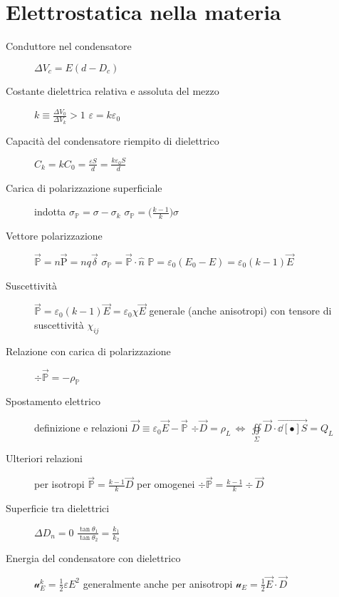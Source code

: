 \documentclass[10pt, oneside]{article}
\begin{document}
\section{Elettrostatica nella materia}

\begin{description}

\item[Conduttore nel condensatore] \hfill $\displaystyle \Delta V_c = E (d - D_c)$

\item[Costante dielettrica relativa e assoluta del mezzo] \hfill $\displaystyle k \equiv \frac{\Delta V_0}{\Delta V_k} > 1$ \qquad $\displaystyle \varepsilon = k \varepsilon_0$

\item[Capacità del condensatore riempito di dielettrico] \hfill $\displaystyle C_k = k C_0 = \frac{\varepsilon S}{d} = \frac{k \varepsilon_0 S}{d}$

\item[Carica di polarizzazione superficiale] indotta \hfill $\displaystyle \sigma_{\mathbb{P}} = \sigma - \sigma_k$ \qquad $\displaystyle \sigma_{\mathbb{P}} = \big(\frac{k-1}{k}\big) \sigma$

\item[Vettore polarizzazione] \hfill $\displaystyle \vec{\mathbb{P}} = n \vec{\mathrm{P}} = nq \vec{\delta}$ \qquad $\sigma_{\mathbb{P}} = \vec{\mathbb{P}}  \cdot \hat{n}$ \qquad $\displaystyle \mathbb{P} = \varepsilon_0 (E_0 - E) = \varepsilon_0 (k-1) \vec{E}$ 

\item[Suscettività] \hfill $\displaystyle \vec{\mathbb{P}} = \varepsilon_0 (k-1) \vec{E} = \varepsilon_0 \chi \vec{E}$ \qquad generale (anche anisotropi) con tensore di suscettività $\chi_{ij}$

\item[Relazione con carica di polarizzazione] \hfill $\displaystyle \div \vec{\mathbb{P}} = - \rho_{\mathbb{P}}$

\item[Spostamento elettrico] definizione e relazioni \hfill $\displaystyle \vec{D} \equiv \varepsilon_0 \vec{E} - \vec{\mathbb{P}}$ \qquad $\displaystyle \div \vec{D} = \rho_L \, \Leftrightarrow \, \oiint\limits_{\Sigma} \vec{D} \cdot \vec{\dd[•]{S}} = Q_L$ 

\item[Ulteriori relazioni] \hfill per isotropi $\displaystyle \vec{\mathbb{P}} = \frac{k-1}{k} \vec{D}$ \qquad per omogenei $\displaystyle \div \vec{\mathbb{P}} = \frac{k-1}{k} \div \vec{D}$

\item[Superficie tra dielettrici] \hfill $\displaystyle \Delta D_n = 0$ \qquad $\displaystyle \frac{\tan \theta_1}{\tan \theta_2} = \frac{k_1}{k_2}$

\item[Energia del condensatore con dielettrico] \hfill $\displaystyle \mathcal{u}_E^k = \frac{1}{2} \varepsilon E^2$ \qquad generalmente anche per anisotropi $\displaystyle \mathcal{u}_E = \frac{1}{2} \vec{E} \cdot \vec{D}$

\end{description}
\end{document}
